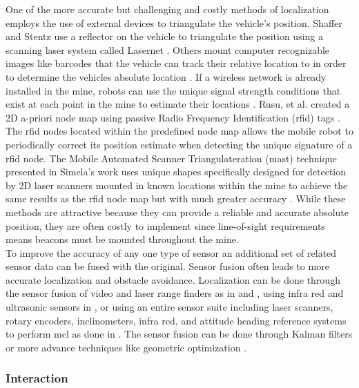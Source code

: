 One of the more accurate but challenging and costly methods of localization employs the use of external devices to triangulate the vehicle's position. Shaffer and Stentz use a reflector on the vehicle to triangulate the position using a scanning laser system called Lasernet \cite{both}. Others mount computer recognizable images like barcodes that the vehicle can track their relative location to in order to determine the vehicles absolute location \cite{barcode}. If a wireless network is already installed in the mine, robots can use the unique signal strength conditions that exist at each point in the mine to estimate their locations \cite{signal}. Rusu, et al. created a 2D a-priori node map using passive Radio Frequency Identification (\acrshort{rfid}) tags \cite{rfirusu}. The \acrshort{rfid} nodes located within the predefined node map allows the mobile robot to periodically correct its position estimate when detecting the unique signature of a \acrshort{rfid} node. The Mobile Automated Scanner Triangulateration (\acrshort{mast}) technique presented in Simela's work uses unique shapes specifically designed for detection by 2D laser scanners mounted in known locations within the mine to achieve the same results as the \acrshort{rfid} node map but with much greater accuracy \cite{simela}. While these methods are attractive because they can provide a reliable and accurate absolute position, they are often costly to implement since line-of-sight requirements means beacons must be mounted throughout the mine.\\

To improve the accuracy of any one type of sensor an additional set of related sensor data can be fused with the original. Sensor fusion often leads to more accurate localization and obstacle avoidance. Localization can be done through the sensor fusion of video and laser range finders as in \cite{vis1} and \cite{vis2}, using infra red and ultrasonic sensors in \cite{irsonic}, or using an entire sensor suite including laser scanners, rotary encoders, inclinometers, infra red, and attitude heading reference systems to perform \acrshort{mcl} as done in \cite{carlo}. The sensor fusion can be done through Kalman filters or more advance techniques like geometric optimization \cite{geom}.\\

\subsubsection{Interaction}
\label{sec:interact}

